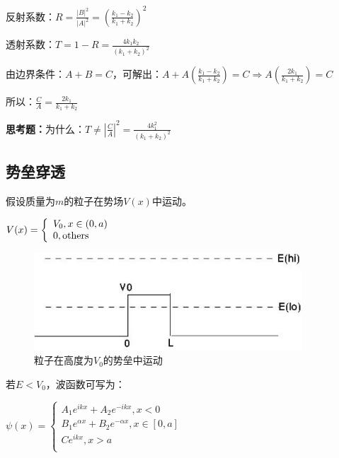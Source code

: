 反射系数：$R = \frac{{\left| B \right|^2 }}{{\left| A \right|^2 }} = \left( {\frac{{k_1  - k_2 }}{{k_1  + k_2 }}} \right)^2 $

透射系数：$T = 1 - R = \frac{{4k_1 k_2 }}{{\left( {k_1  + k_2 } \right)^2 }}$

由边界条件：$A+B=C$，可解出：$A + A\left( {\frac{{k_1  - k_2 }}{{k_1  + k_2 }}} \right) = C \Rightarrow A\left( {\frac{{2k_1 }}{{k_1  + k_2 }}} \right) = C$

所以：$\frac{C}{A} = \frac{{2k_1 }}{{k_1  + k_2 }}$

\textbf{思考题：}为什么：$T \ne \left| {\frac{C}{A}} \right|^2  = \frac{{4k_1 ^2 }}{{\left( {k_1  + k_2 } \right)^2 }}$

\subsection{势垒穿透}


假设质量为$m$的粒子在势场$V(x)$中运动。

\begin{center}
$V(x) = \left\{ \begin{array}{l}
 V_0 ,x \in \left( {0,a} \right) \\
 0,{\rm{others}} \\
 \end{array} \right.$
\end{center}

\begin{figure}[h]
\begin{center}
\includegraphics[clip,width=10cm]{1DProblem/11-3.ps}
\caption{粒子在高度为$V_0$的势垒中运动}
\end{center}
\end{figure}

若$E<V_0$，波函数可写为：

\begin{center}
$\psi \left( x \right) = \left\{ \begin{array}{l}
 A_1 e^{ikx}  + A_2 e^{ - ikx} ,x < 0 \\
 B_1 e^{\alpha x}  + B_2 e^{ - \alpha x} ,x \in \left[ {0,a} \right] \\
 Ce^{ikx} ,x > a \\
 \end{array} \right.$
\end{center}

